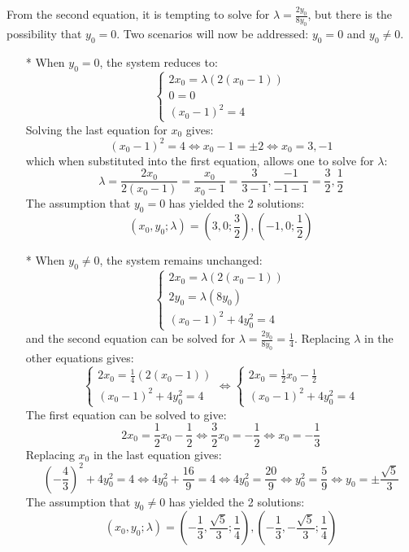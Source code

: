 \documentclass{article}
\begin{document}
\begin{itemize}
From the second equation, it is tempting to solve for \(\lambda = \frac{2y_0}{8y_0}\), but there is the possibility that \(y_0 = 0\). Two scenarios will now be addressed: \(y_0 = 0\) and \(y_0 \neq 0\). 
\begin{itemize}
\item[*] 
When \(y_0 = 0\), the system reduces to:
\[\left\{\begin{array}{c}
2x_0 = \lambda (2(x_0 - 1)) \\ 
0 = 0 \\ 
(x_0-1)^2 = 4 
\end{array}\right.\]
Solving the last equation for \(x_0\) gives:
\[(x_0-1)^2 = 4 \iff x_0 - 1 = \pm 2 \iff x_0 = 3, -1\]
which when substituted into the first equation, allows one to solve for \(\lambda\):
\[\lambda = \frac{2x_0}{2(x_0 - 1)} = \frac{x_0}{x_0 - 1} = \frac{3}{3 - 1}, \frac{-1}{-1 - 1} = \frac{3}{2}, \frac{1}{2}\]
The assumption that \(y_0 = 0\) has yielded the 2 solutions:
\[(x_0, y_0; \lambda) = (3, 0; \frac{3}{2}), (-1, 0; \frac{1}{2})\] 
\item[*] 
When \(y_0 \neq 0\), the system remains unchanged:
\[\left\{\begin{array}{c}
2x_0 = \lambda (2(x_0 - 1)) \\ 
2y_0 = \lambda (8y_0) \\ 
(x_0-1)^2 + 4y_0^2 = 4 
\end{array}\right.\]
and the second equation can be solved for \(\lambda = \frac{2y_0}{8y_0} = \frac{1}{4}\). Replacing \(\lambda\) in the other equations gives:
\[\left\{\begin{array}{c}
2x_0 = \frac{1}{4} (2(x_0 - 1)) \\ 
(x_0-1)^2 + 4y_0^2 = 4 
\end{array}\right. \iff \left\{\begin{array}{c}
2x_0 = \frac{1}{2}x_0 - \frac{1}{2} \\ 
(x_0-1)^2 + 4y_0^2 = 4 
\end{array}\right.\]
The first equation can be solved to give:
\[2x_0 = \frac{1}{2}x_0 - \frac{1}{2} \iff \frac{3}{2}x_0 = -\frac{1}{2} \iff x_0 = -\frac{1}{3}\]
Replacing \(x_0\) in the last equation gives:
\[(-\frac{4}{3})^2 + 4y_0^2 = 4 \iff 4y_0^2 + \frac{16}{9} = 4 \iff 4y_0^2 = \frac{20}{9} \iff y_0^2 = \frac{5}{9} \iff y_0 = \pm\frac{\sqrt{5}}{3}\]
The assumption that \(y_0 \neq 0\) has yielded the 2 solutions:
\[(x_0, y_0; \lambda) = (-\frac{1}{3}, \frac{\sqrt{5}}{3}; \frac{1}{4}), (-\frac{1}{3}, -\frac{\sqrt{5}}{3}; \frac{1}{4})\]
\end{itemize}


\end{itemize}
\end{document}
